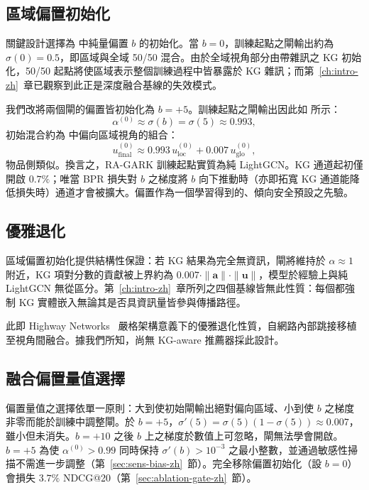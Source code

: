 \subsection{區域偏置初始化}
\label{sec:gate-bias-zh}

關鍵設計選擇為  中純量偏置 $b$ 的初始化。當 $b = 0$，訓練起點之閘輸出約為 $\sigma(0) = 0.5$，即區域與全域 50/50 混合。由於全域視角部分由帶雜訊之 KG 初始化，50/50 起點將使區域表示整個訓練過程中皆暴露於 KG 雜訊；而第~\ref{ch:intro-zh}~章已觀察到此正是深度融合基線的失效模式。

我們改將兩個閘的偏置皆初始化為 $b = +5$。訓練起點之閘輸出因此如  所示：
\begin{equation}
\label{eq:alpha-init-zh}
\alpha^{(0)} \approx \sigma(b) = \sigma(5) \approx 0.993,
\end{equation}
初始混合約為  中偏向區域視角的組合：
\begin{equation}
\label{eq:mix-init-zh}
u_{\mathrm{final}}^{(0)} \approx 0.993\, u_{\mathrm{loc}}^{(0)} + 0.007\, u_{\mathrm{glo}}^{(0)},
\end{equation}
物品側類似。換言之，RA-GARK 訓練起點實質為純 LightGCN。KG 通道起初僅開啟 $0.7\%$；唯當 BPR 損失對 $b$ 之梯度將 $b$ 向下推動時（亦即拓寬 KG 通道能降低損失時）通道才會被擴大。偏置作為一個學習得到的、傾向安全預設之先驗。

\subsection{優雅退化}
\label{sec:gate-degrade-zh}

區域偏置初始化提供結構性保證：若 KG 結果為完全無資訊，閘將維持於 $\alpha \approx 1$ 附近，KG 項對分數的貢獻被上界約為 $0.007 \cdot \|\mathbf{a}\| \cdot \|\mathbf{u}\|$，模型於經驗上與純 LightGCN 無從區分。第~\ref{ch:intro-zh}~章所列之四個基線皆無此性質：每個都強制 KG 實體嵌入無論其是否具資訊量皆參與傳播路徑。

此即 Highway Networks~\cite{srivastava2015highway} 嚴格架構意義下的優雅退化性質，自網路內部跳接移植至視角間融合。據我們所知，尚無 KG-aware 推薦器採此設計。

\subsection{融合偏置量值選擇}
\label{sec:gate-bias-magnitude-zh}

偏置量值之選擇依單一原則：大到使初始閘輸出絕對偏向區域、小到使 $b$ 之梯度非零而能於訓練中調整閘。於 $b = +5$，$\sigma'(5) = \sigma(5)(1 - \sigma(5)) \approx 0.007$，雖小但未消失。$b = +10$ 之後 $b$ 上之梯度於數值上可忽略，閘無法學會開啟。$b = +5$ 為使 $\alpha^{(0)} > 0.99$ 同時保持 $\sigma'(b) > 10^{-3}$ 之最小整數，並通過敏感性掃描不需進一步調整（第~\ref{sec:sens-bias-zh}~節）。完全移除偏置初始化（設 $b = 0$）會損失 $3.7\%$ NDCG@20（第~\ref{sec:ablation-gate-zh}~節）。

